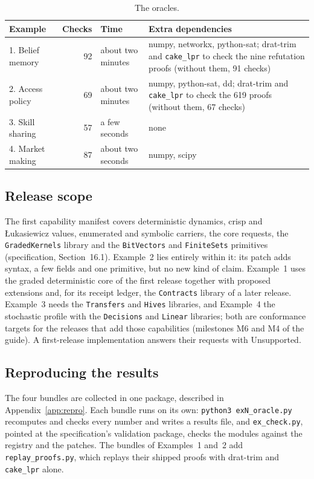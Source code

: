 \documentclass[11pt]{article}
\newcommand{\fpath}[1]{\nolinkurl{#1}}
\newcommand{\code}[1]{\texttt{#1}}
\newcommand{\spec}[1]{specification, Section~#1}
\theoremstyle{definition}
\theoremstyle{plain}
\begin{document}
\begin{table}[ht]
\centering\small
\begin{tabularx}{\textwidth}{lrlX}
\toprule
Example & Checks & Time & Extra dependencies\\
\midrule
1. Belief memory & 92 & about two minutes & numpy, networkx, python-sat; drat-trim and \code{cake\_lpr} to check the nine refutation proofs (without them, 91 checks)\\
2. Access policy & 69 & about two minutes & numpy, python-sat, dd; drat-trim and \code{cake\_lpr} to check the 619 proofs (without them, 67 checks)\\
3. Skill sharing & 57 & a few seconds & none\\
4. Market making & 87 & about two seconds & numpy, scipy\\
\bottomrule
\end{tabularx}
\caption{The oracles.}\label{tab:oracles}
\end{table}

\subsection{Release scope}

The first capability manifest covers deterministic dynamics, crisp and \L{}ukasiewicz values,
enumerated and symbolic carriers, the core requests, the \code{GradedKernels} library and the
\code{BitVectors} and \code{FiniteSets} primitives (\spec{16.1}). Example~2 lies entirely within
it: its patch adds syntax, a few fields and one primitive, but no new kind of claim. Example~1 uses the
graded deterministic core of the first release together with proposed extensions and, for its
receipt ledger, the \code{Contracts} library of a later release. Example~3 needs the
\code{Transfers} and \code{Hives} libraries, and Example~4 the stochastic profile with the
\code{Decisions} and \code{Linear} libraries; both are conformance targets for the releases that add
those capabilities (milestones M6 and M4 of the guide). A first-release implementation answers
their requests with Unsupported.

\subsection{Reproducing the results}

The four bundles are collected in one package, described in Appendix~\ref{app:repro}. Each bundle
runs on its own: \code{python3 exN\_oracle.py} recomputes and checks every number and writes a
results file, and \fpath{ex_check.py}, pointed at the specification's validation package, checks
the modules against the registry and the patches. The bundles of Examples~1 and~2 add
\fpath{replay_proofs.py}, which replays their shipped proofs with drat-trim and \code{cake\_lpr}
alone.
\end{document}
